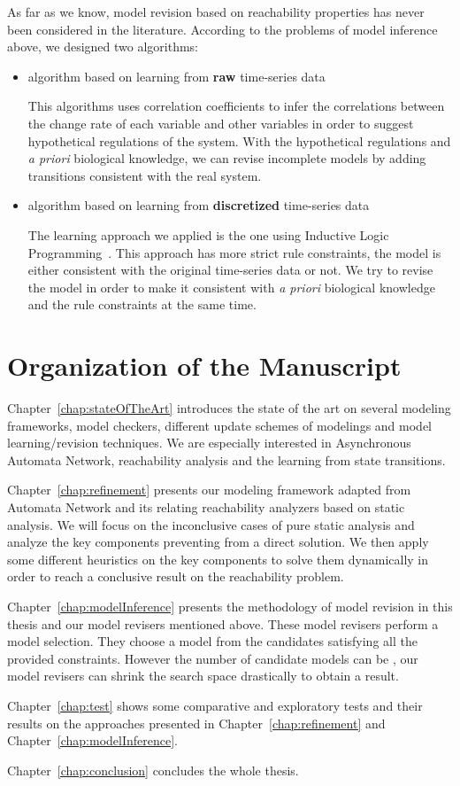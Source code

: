 As far as we know, model revision based on reachability properties has never been considered in the literature.
According to the problems of model inference above, we designed two algorithms:
\begin{itemize}
    \item algorithm based on learning from \textbf{raw} time-series data
    
    This algorithms uses correlation coefficients to infer the correlations between the change rate of each variable and other variables in order to suggest hypothetical regulations of the system.
    With the hypothetical regulations and \textit{a priori} biological knowledge, we can revise incomplete models by adding transitions consistent with the real system.
    \item algorithm based on learning from \textbf{discretized} time-series data
    
    The learning approach we applied is the one using Inductive Logic Programming~\cite{ribeiro2018learning}.
    This approach has more strict rule constraints, the model is either consistent with the original time-series data or not.
    We try to revise the model in order to make it consistent with \textit{a priori} biological knowledge and the rule constraints at the same time.
\end{itemize}


\section{Organization of the Manuscript}
Chapter~\ref{chap:stateOfTheArt} introduces the state of the art on several modeling frameworks, model checkers, different update schemes of modelings and model learning/revision techniques.
We are especially interested in Asynchronous Automata Network, reachability analysis and the learning from state transitions.

Chapter~\ref{chap:refinement} presents our modeling framework adapted from Automata Network and its relating reachability analyzers based on static analysis.
We will focus on the inconclusive cases of pure static analysis and analyze the key components preventing from a direct solution.
We then apply some different heuristics on the key components to solve them dynamically in order to reach a conclusive result on the reachability problem.

Chapter~\ref{chap:modelInference} presents the methodology of model revision in this thesis and our model revisers mentioned above.
These model revisers perform a model selection. 
They choose a model from the candidates satisfying all the provided constraints.
However the number of candidate models can be , our model revisers can shrink the search space drastically to obtain a result.

Chapter~\ref{chap:test} shows some comparative and exploratory tests and their results on the approaches presented in Chapter~\ref{chap:refinement} and Chapter~\ref{chap:modelInference}.

Chapter~\ref{chap:conclusion} concludes the whole thesis.